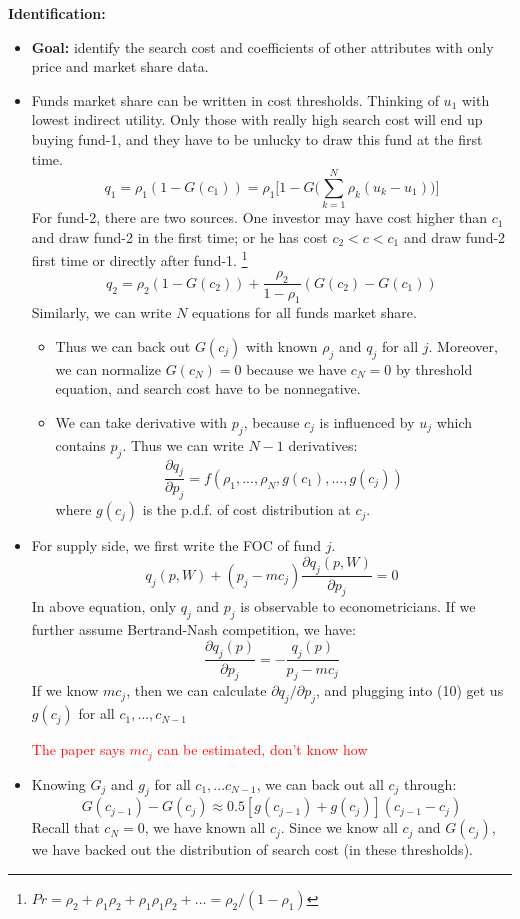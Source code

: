 \documentclass{book}
\theoremstyle{plain}
\theoremstyle{definition}
\begin{document}
\vspace{1em}
\noindent
\textbf{Identification:}
\begin{itemize}
	\item \textbf{Goal:} identify the search cost and coefficients of other attributes with only price and market share data.
	\item Funds market share can be written in cost thresholds. Thinking of $u_1$ with lowest indirect utility. Only those with really high search cost will end up buying fund-1, and they have to be unlucky to draw this fund at the first time.
	\[q_1=\rho_1(1-G(c_1))=\rho_1\Big[1-G\Big(\sum_{k=1}^N{\rho_k(u_k-u_1)}\Big)\Big]\]
	For fund-2, there are two sources. One investor may have cost higher than $c_1$ and draw fund-2 in the first time; or he has cost $c_2<c<c_1$ and draw fund-2 first time or directly after fund-1.
	\footnote{$Pr=\rho_2+\rho_1\rho_2+\rho_1\rho_1\rho_2+...=\rho_2/(1-\rho_1)$}
	\[q_2 = \rho_2(1-G(c_2))+\frac{\rho_2}{1-\rho_1}(G(c_2)-G(c_1)) \tag{7}\]
	Similarly, we can write $N$ equations for all funds market share. 
	\begin{itemize}
		\item Thus we can back out $G(c_j)$ with known $\rho_j$ and $q_j$ for all $j$.
		Moreover, we can normalize $G(c_N)=0$ because we have $c_N=0$ by threshold equation, and search cost have to be nonnegative.
		\item We can take derivative with $p_j$, because $c_j$ is influenced by $u_j$ which contains $p_j$. Thus we can write $N-1$ derivatives:
		\[\frac{\partial q_j}{\partial p_j}
		=f(\rho_1,...,\rho_N,g(c_1),...,g(c_j)) \tag{10}\]
		where $g(c_j)$ is the p.d.f. of cost distribution at $c_j$.
	\end{itemize}
	
	\item For supply side, we first write the FOC of fund $j$.
	\[q_j(p,W)+(p_j-mc_j)\frac{\partial q_j(p,W)}{\partial p_j}=0 \tag{9}\]
	In above equation, only $q_j$ and $p_j$ is observable to econometricians.
	If we further assume Bertrand-Nash competition, we have:
	\[\frac{\partial q_j(p)}{\partial p_j}
	=-\frac{q_j(p)}{p_j-mc_j}\]
	If we know $mc_j$, then we can calculate $\partial q_j/\partial p_j$, and plugging into (10) get us $g(c_j)$ for all $c_1, ... ,c_{N-1}$

	\textcolor{red}{The paper says $mc_j$ can be estimated, don't know how}

	\item Knowing $G_j$ and $g_j$ for all $c_1,...c_{N-1}$, we can back out all $c_j$ through:
	\[G(c_{j-1})-G(c_j)\approx 0.5[g(c_{j-1})+g(c_j)](c_{j-1}-c_j)\]
	Recall that $c_N=0$, we have known all $c_j$.
	Since we know all $c_j$ and $G(c_j)$, we have backed out the distribution of search cost (in these thresholds).
\end{itemize}
\end{document}

